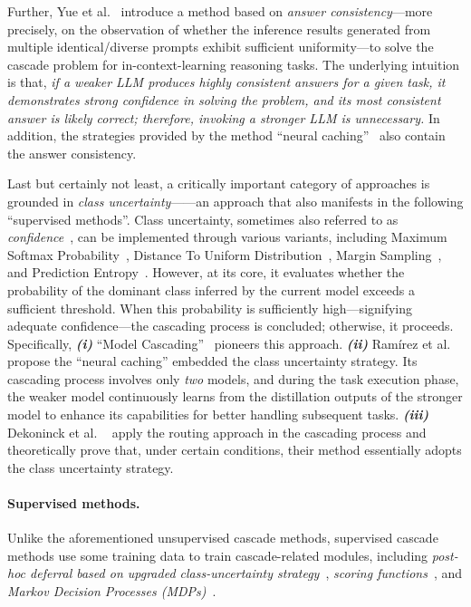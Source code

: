 \documentclass{article}
\begin{document}
Further, Yue et al.~ introduce a method based on \textit{answer consistency}—more precisely, on the observation of whether the inference results generated from multiple identical/diverse prompts exhibit sufficient uniformity—to solve the cascade problem for in-context-learning reasoning tasks.
The underlying intuition is that, \textit{if a weaker LLM produces highly consistent answers for a given task, it demonstrates strong confidence in solving the problem, and its most consistent answer is likely correct; therefore, invoking a stronger LLM is unnecessary.}
In addition, the strategies provided by the method ``neural caching''~\cite{ramirez2023cache} also contain the answer consistency.




Last but certainly not least, a critically important category of approaches is grounded in \textit{class uncertainty}------an approach that also manifests in the following ``supervised methods''. 
Class uncertainty, sometimes also referred to as \textit{confidence}~\cite{varshney2022model,ramirez2023cache,jitkrittum2024does}, can be implemented through various variants, including Maximum Softmax Probability~\cite{varshney2022model}, Distance To Uniform Distribution~\cite{varshney2022model}, Margin Sampling~\cite{ramirez2023cache}, and Prediction Entropy~\cite{ramirez2023cache}. 
However,  at its core, it evaluates whether the probability of the dominant class inferred by the current model exceeds a sufficient threshold.
When this probability is sufficiently high---signifying adequate confidence---the cascading process is concluded; otherwise, it proceeds.
Specifically, 
\textbf{\textit{(i)}}  ``Model Cascading''~\cite{varshney2022model} pioneers this approach. 
\textbf{\textit{(ii)}} Ram\'{i}rez et al.~ propose the  ``neural caching'' embedded the class uncertainty strategy.
Its cascading process involves only \textit{two}  models, and during the task execution phase, the weaker model continuously learns from the distillation outputs of the stronger model to enhance its capabilities for better handling subsequent tasks.
\textbf{\textit{(iii)}}
Dekoninck et al. ~ apply the routing approach in the cascading process and theoretically prove that, under certain conditions, their method essentially adopts the class uncertainty strategy.





\paragraph{Supervised methods.}
Unlike the aforementioned unsupervised cascade methods, supervised cascade methods use some training data to train cascade-related modules, including \textit{post-hoc deferral based on upgraded class-uncertainty strategy}~\cite{jitkrittum2024does}, \textit{scoring functions}~\cite{chen2023frugalgpt,gupta2024language}, and \textit{Markov Decision Processes (MDPs)}~\cite{aggarwal2023automix,hu2024dynamic}.
\end{document}
